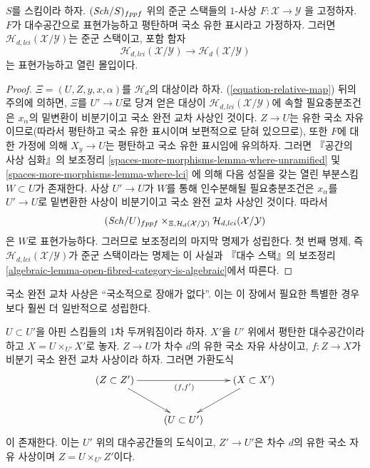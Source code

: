 \begin{lemma}
\label{lemma-lci-locus-stack-in-groupoids}
$S$를 스킴이라 하자. $(\mathit{Sch}/S)_{fppf}$ 위의 준군 스택들의 $1$-사상
$F : \mathcal{X} \longrightarrow \mathcal{Y}$
을 고정하자. $F$가 대수공간으로 표현가능하고 평탄하며 국소 유한
표시라고 가정하자. 그러면 $\mathcal{H}_{d, lci}(\mathcal{X}/\mathcal{Y})$는
준군 스택이고, 포함 함자
$$
\mathcal{H}_{d, lci}(\mathcal{X}/\mathcal{Y})
\longrightarrow
\mathcal{H}_d(\mathcal{X}/\mathcal{Y})
$$
는 표현가능하고 열린 몰입이다.
\end{lemma}

\begin{proof}
$\Xi = (U, Z, y, x, \alpha)$를 $\mathcal{H}_d$의 대상이라 하자.
(\ref{equation-relative-map}) 뒤의 주의에 의하면, $\Xi$를 $U' \to U$로
당겨 얻은 대상이 $\mathcal{H}_{d, lci}(\mathcal{X}/\mathcal{Y})$에
속할 필요충분조건은 $x_\alpha$의 밑변환이 비분기이고 국소 완전 교차
사상인 것이다. $Z \to U$는 유한 국소 자유이므로(따라서 평탄하고
국소 유한 표시이며 보편적으로 닫혀 있으므로), 또한 $F$에 대한 가정에
의해 $X_y \to U$는 평탄하고 국소 유한 표시임에 유의하자. 그러면
『공간의 사상 심화』의 보조정리
\ref{spaces-more-morphisms-lemma-where-unramified} 및
\ref{spaces-more-morphisms-lemma-where-lci}
에 의해 다음 성질을 갖는 열린 부분스킴 $W \subset U$가 존재한다.
사상 $U' \to U$가 $W$를 통해 인수분해될 필요충분조건은
$x_\alpha$를 $U' \to U$로 밑변환한 사상이 비분기이고 국소 완전
교차 사상인 것이다. 따라서
$$
(\mathit{Sch}/U)_{fppf}
\times_{\Xi, \mathcal{H}_d(\mathcal{X}/\mathcal{Y})}
\mathcal{H}_{d, lci}(\mathcal{X}/\mathcal{Y})
$$
은 $W$로 표현가능하다. 그러므로 보조정리의 마지막 명제가 성립한다.
첫 번째 명제, 즉 $\mathcal{H}_{d, lci}(\mathcal{X}/\mathcal{Y})$가
준군 스택이라는 명제는 이 사실과 『대수 스택』의 보조정리
\ref{algebraic-lemma-open-fibred-category-is-algebraic}에서 따른다.
\end{proof}

\noindent
국소 완전 교차 사상은 ``국소적으로 장애가 없다''.
이는 이 장에서 필요한 특별한 경우보다 훨씬 더 일반적으로 성립한다.

\begin{lemma}
\label{lemma-lci-unobstructed}
$U \subset U'$을 아핀 스킴들의 1차 두꺼워짐이라 하자.
$X'$을 $U'$ 위에서 평탄한 대수공간이라 하고 $X = U \times_{U'} X'$로
놓자. $Z \to U$가 차수 $d$의 유한 국소 자유 사상이고,
$f : Z \to X$가 비분기 국소 완전 교차 사상이라 하자.
그러면 가환도식
$$
\xymatrix{
(Z \subset Z') \ar[rd] \ar[rr]_{(f, f')} & & (X \subset X') \ar[ld] \\
& (U \subset U')
}
$$
이 존재한다. 이는 $U'$ 위의 대수공간들의 도식이고, $Z' \to U'$은
차수 $d$의 유한 국소 자유 사상이며 $Z = U \times_{U'} Z'$이다.
\end{lemma}

